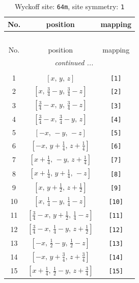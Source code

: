 \documentclass[fleqn,8pt]{jsarticle}
\begin{document}
\begin{longtable}{ccc}
\caption{Wyckoff site: {\tt 64m}, site symmetry: {\tt 1}}
 \\
 \hline \hline
No. & position & mapping \\ \hline \endfirsthead

\multicolumn{2}{l}{\tablename\ \thetable{}} \\
 \hline \hline
No. & position & mapping \\ \hline \endhead

 \hline \hline
\multicolumn{2}{r}{\footnotesize\it continued ...} \\ \endfoot

 \hline \hline
\multicolumn{2}{r}{} \\ \endlastfoot

1 & $\left[ x,\, y,\, z \right]$ & {\tt [1]} \\ \hline
2 & $\left[ x,\, \frac{3}{4} - y,\, \frac{3}{4} - z \right]$ & {\tt [2]} \\ \hline
3 & $\left[ \frac{3}{4} - x,\, y,\, \frac{3}{4} - z \right]$ & {\tt [3]} \\ \hline
4 & $\left[ \frac{3}{4} - x,\, \frac{3}{4} - y,\, z \right]$ & {\tt [4]} \\ \hline
5 & $\left[ - x,\, - y,\, - z \right]$ & {\tt [5]} \\ \hline
6 & $\left[ - x,\, y + \frac{1}{4},\, z + \frac{1}{4} \right]$ & {\tt [6]} \\ \hline
7 & $\left[ x + \frac{1}{4},\, - y,\, z + \frac{1}{4} \right]$ & {\tt [7]} \\ \hline
8 & $\left[ x + \frac{1}{4},\, y + \frac{1}{4},\, - z \right]$ & {\tt [8]} \\ \hline
9 & $\left[ x,\, y + \frac{1}{2},\, z + \frac{1}{2} \right]$ & {\tt [9]} \\ \hline
10 & $\left[ x,\, \frac{1}{4} - y,\, \frac{1}{4} - z \right]$ & {\tt [10]} \\ \hline
11 & $\left[ \frac{3}{4} - x,\, y + \frac{1}{2},\, \frac{1}{4} - z \right]$ & {\tt [11]} \\ \hline
12 & $\left[ \frac{3}{4} - x,\, \frac{1}{4} - y,\, z + \frac{1}{2} \right]$ & {\tt [12]} \\ \hline
13 & $\left[ - x,\, \frac{1}{2} - y,\, \frac{1}{2} - z \right]$ & {\tt [13]} \\ \hline
14 & $\left[ - x,\, y + \frac{3}{4},\, z + \frac{3}{4} \right]$ & {\tt [14]} \\ \hline
15 & $\left[ x + \frac{1}{4},\, \frac{1}{2} - y,\, z + \frac{3}{4} \right]$ & {\tt [15]} \\ \hline

\end{longtable}
\end{document}

